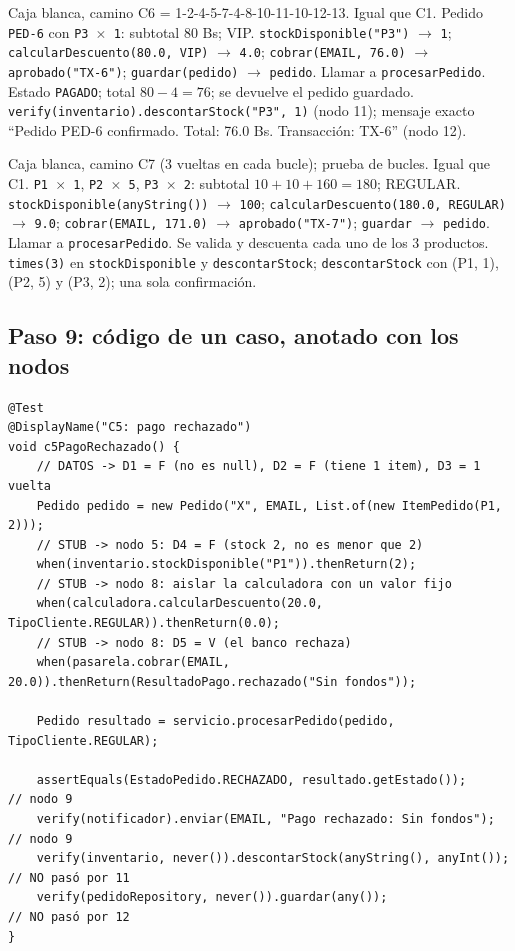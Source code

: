 \documentclass[11pt,a4paper,oneside]{report}
\newcommand{\code}[1]{\texttt{#1}}
\begin{document}
{Caja blanca, camino C6 = 1-2-4-5-7-4-8-10-11-10-12-13.}
{Igual que C1.}
{Pedido \code{PED-6} con \code{P3 $\times$ 1}: subtotal 80 Bs; VIP.}
{\code{stockDisponible("P3")} $\rightarrow$ \code{1}; \code{calcularDescuento(80.0, VIP)} $\rightarrow$ \code{4.0}; \code{cobrar(EMAIL, 76.0)} $\rightarrow$ \code{aprobado("TX-6")}; \code{guardar(pedido)} $\rightarrow$ \code{pedido}.}
{Llamar a \code{procesarPedido}.}
{Estado \code{PAGADO}; total $80 - 4 = 76$; se devuelve el pedido guardado.}
{\code{verify(inventario).descontarStock("P3", 1)} (nodo 11); mensaje exacto ``Pedido PED-6 confirmado. Total: 76.0 Bs. Transacción: TX-6'' (nodo 12).}

{Caja blanca, camino C7 (3 vueltas en cada bucle); prueba de bucles.}
{Igual que C1.}
{\code{P1 $\times$ 1}, \code{P2 $\times$ 5}, \code{P3 $\times$ 2}: subtotal $10 + 10 + 160 = 180$; REGULAR.}
{\code{stockDisponible(anyString())} $\rightarrow$ \code{100}; \code{calcularDescuento(180.0, REGULAR)} $\rightarrow$ \code{9.0}; \code{cobrar(EMAIL, 171.0)} $\rightarrow$ \code{aprobado("TX-7")}; \code{guardar} $\rightarrow$ \code{pedido}.}
{Llamar a \code{procesarPedido}.}
{Se valida y descuenta cada uno de los 3 productos.}
{\code{times(3)} en \code{stockDisponible} y \code{descontarStock}; \code{descontarStock} con (P1, 1), (P2, 5) y (P3, 2); una sola confirmación.}

\subsection{Paso 9: código de un caso, anotado con los nodos}
\begin{lstlisting}[caption={Camino C5: cada línea de la prueba se relaciona con un nodo del grafo}]
@Test
@DisplayName("C5: pago rechazado")
void c5PagoRechazado() {
    // DATOS -> D1 = F (no es null), D2 = F (tiene 1 item), D3 = 1 vuelta
    Pedido pedido = new Pedido("X", EMAIL, List.of(new ItemPedido(P1, 2)));
    // STUB -> nodo 5: D4 = F (stock 2, no es menor que 2)
    when(inventario.stockDisponible("P1")).thenReturn(2);
    // STUB -> nodo 8: aislar la calculadora con un valor fijo
    when(calculadora.calcularDescuento(20.0, TipoCliente.REGULAR)).thenReturn(0.0);
    // STUB -> nodo 8: D5 = V (el banco rechaza)
    when(pasarela.cobrar(EMAIL, 20.0)).thenReturn(ResultadoPago.rechazado("Sin fondos"));

    Pedido resultado = servicio.procesarPedido(pedido, TipoCliente.REGULAR);

    assertEquals(EstadoPedido.RECHAZADO, resultado.getEstado());          // nodo 9
    verify(notificador).enviar(EMAIL, "Pago rechazado: Sin fondos");      // nodo 9
    verify(inventario, never()).descontarStock(anyString(), anyInt());    // NO pasó por 11
    verify(pedidoRepository, never()).guardar(any());                     // NO pasó por 12
}
\end{lstlisting}
\end{document}
